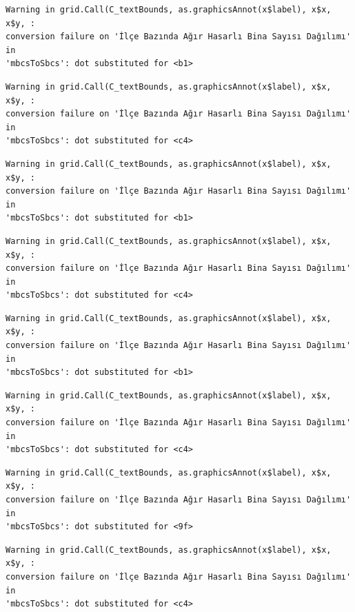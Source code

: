 \documentclass[
  11pt,
  a4paper,
  DIV=11,
  numbers=noendperiod]{scrartcl}
\begin{document}
\begin{verbatim}
Warning in grid.Call(C_textBounds, as.graphicsAnnot(x$label), x$x, x$y, :
conversion failure on 'İlçe Bazında Ağır Hasarlı Bina Sayısı Dağılımı' in
'mbcsToSbcs': dot substituted for <b1>
\end{verbatim}

\begin{verbatim}
Warning in grid.Call(C_textBounds, as.graphicsAnnot(x$label), x$x, x$y, :
conversion failure on 'İlçe Bazında Ağır Hasarlı Bina Sayısı Dağılımı' in
'mbcsToSbcs': dot substituted for <c4>
\end{verbatim}

\begin{verbatim}
Warning in grid.Call(C_textBounds, as.graphicsAnnot(x$label), x$x, x$y, :
conversion failure on 'İlçe Bazında Ağır Hasarlı Bina Sayısı Dağılımı' in
'mbcsToSbcs': dot substituted for <b1>
\end{verbatim}

\begin{verbatim}
Warning in grid.Call(C_textBounds, as.graphicsAnnot(x$label), x$x, x$y, :
conversion failure on 'İlçe Bazında Ağır Hasarlı Bina Sayısı Dağılımı' in
'mbcsToSbcs': dot substituted for <c4>
\end{verbatim}

\begin{verbatim}
Warning in grid.Call(C_textBounds, as.graphicsAnnot(x$label), x$x, x$y, :
conversion failure on 'İlçe Bazında Ağır Hasarlı Bina Sayısı Dağılımı' in
'mbcsToSbcs': dot substituted for <b1>
\end{verbatim}

\begin{verbatim}
Warning in grid.Call(C_textBounds, as.graphicsAnnot(x$label), x$x, x$y, :
conversion failure on 'İlçe Bazında Ağır Hasarlı Bina Sayısı Dağılımı' in
'mbcsToSbcs': dot substituted for <c4>
\end{verbatim}

\begin{verbatim}
Warning in grid.Call(C_textBounds, as.graphicsAnnot(x$label), x$x, x$y, :
conversion failure on 'İlçe Bazında Ağır Hasarlı Bina Sayısı Dağılımı' in
'mbcsToSbcs': dot substituted for <9f>
\end{verbatim}

\begin{verbatim}
Warning in grid.Call(C_textBounds, as.graphicsAnnot(x$label), x$x, x$y, :
conversion failure on 'İlçe Bazında Ağır Hasarlı Bina Sayısı Dağılımı' in
'mbcsToSbcs': dot substituted for <c4>
\end{verbatim}
\end{document}
